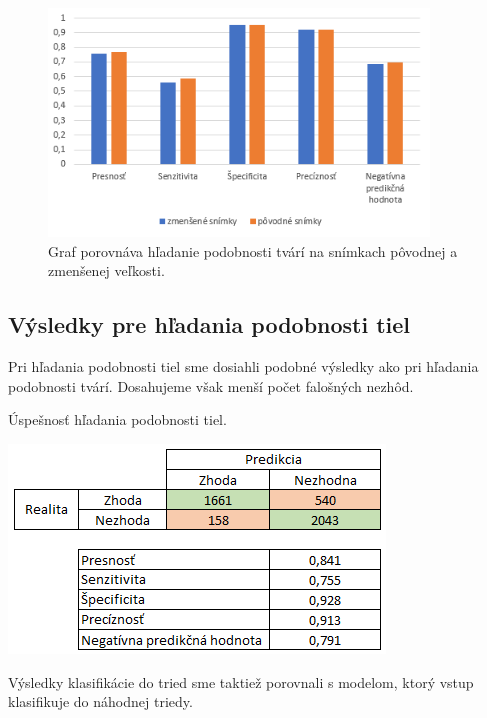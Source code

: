 \begin{figure}[H]
\centerline{\includegraphics[width=0.9\textwidth]{images/graph_face12_compare.png}}
\caption[Porovnanie hľadania podobnosti tvárí na snímkach pôvodnej a zmenšenej veľkosti]{Graf porovnáva hľadanie podobnosti tvárí na snímkach pôvodnej a zmenšenej veľkosti.}
\label{obr:graph_face12_compare}
\end{figure}


\subsection{Výsledky pre hľadania podobnosti tiel}
Pri hľadania podobnosti tiel sme dosiahli podobné výsledky ako pri hľadania podobnosti tvárí.
Dosahujeme však menší počet falošných nezhôd.
\begin{table}[H]
  \caption[Úspešnosť hľadania podobnosti tiel]{Úspešnosť hľadania podobnosti tiel.}
  \label{tbl:body1_table}
  \begin{center}
  \includegraphics{images/body1_table}
  \end{center}
\end{table}

Výsledky klasifikácie do tried sme taktiež porovnali s modelom, ktorý vstup klasifikuje do náhodnej triedy.

